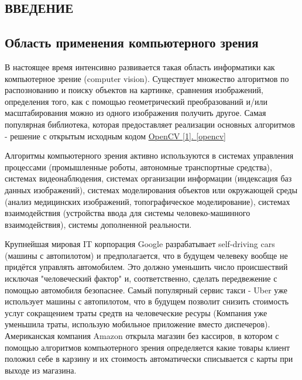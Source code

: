 \begin{center}
    \section*{ВВЕДЕНИЕ}    
\end{center}
    \subsection*{Область применения компьютерного зрения}
    
    \tab В настоящее время интенсивно развивается такая область информатики как компьютерное зрение (computer vision). Существует множество алгоритмов по распознованию и поиску объектов на картинке, сравнения изображений, определения того, как с помощью геометрический преобразований и/или масштабирования можно из одного изображения получить другое. Самая популярная библиотека, которая предоставляет реализации основных алгоритмов - решение с открытым исходным кодом \hyperref[opencv]{OpenCV [1]. \ref{opencv} }
    
    Алгоритмы компьютерного зрения активно используются в системах управления процессами (промышленные роботы, автономные транспортные средства), системах видеонаблюдения, системах организации информации (индексация баз данных изображений), системах моделирования объектов или окружающей среды (анализ медицинских изображений, топографическое моделирование), системах взаимодействия (устройства ввода для системы человеко-машинного взаимодействия), системы дополненной реальности.
    
    \vspace{1em}
    
    Крупнейшая мировая IT корпорация Google разрабатывает self-driving cars (машины с автопилотом) и предполагается, что в будущем челевеку вообще не придётся управлять автомобилем. Это должно уменьшить число происшествий исключая "человеческий фактор" и, соответственно, сделать передвежение с помощью автомобиля безопаснее. Самый популярный сервис такси - Uber уже использует машины с автопилотом, что в будущем позволит снизить стоимость услуг сокращением траты средтв на человеческие ресуры (Компания уже уменьшила траты, использую мобильное приложение вместо диспечеров). Американская компания Amazon открыла магазин без кассиров, в котором с помощью алгоритмов компьютерного зрения определяется какие товары клиент положил себе в карзину и их стоимость автоматически списывается с карты при выходе из магазина.
    
